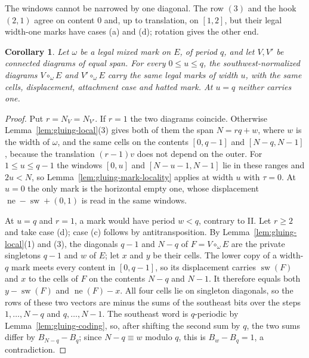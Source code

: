 \documentclass[11pt,a4paper]{amsart}
\numberwithin{equation}{section}
\theoremstyle{plain}
\newtheorem{corollary}[theorem]{Corollary}
\theoremstyle{definition}
\begin{document}
The windows cannot be narrowed by one diagonal.  The row \((3)\) and the hook \((2,1)\) agree on content \(0\) and, up to translation, on \([1,2]\), but their legal width-one marks have cases (a) and (d); rotation gives the other end.

\begin{corollary}\label{cor:gluing-mark-transfer}
Let \(\omega\) be a legal mixed mark on \(E\), of period \(q\), and let \(V,V'\) be connected diagrams of equal span.  For every \(0\le u\le q\), the southwest-normalized diagrams \(V\circ_\omega E\) and \(V'\circ_\omega E\) carry the same legal marks of width \(u\), with the same cells, displacement, attachment case and hatted mark.  At \(u=q\) neither carries one.
\end{corollary}
\begin{proof}
Put \(r=N_V=N_{V'}\).  If \(r=1\) the two diagrams coincide.  Otherwise Lemma~\ref{lem:gluing-local}(3) gives both of them the span \(N=rq+w\), where \(w\) is the width of \(\omega\), and the same cells on the contents \([0,q-1]\) and \([N-q,N-1]\), because the translation \((r-1)v\) does not depend on the outer.  For \(1\le u\le q-1\) the windows \([0,u]\) and \([N-u-1,N-1]\) lie in these ranges and \(2u<N\), so Lemma~\ref{lem:gluing-mark-locality} applies at width \(u\) with \(\tau=0\).  At \(u=0\) the only mark is the horizontal empty one, whose displacement \(\operatorname{ne}-\operatorname{sw}+(0,1)\) is read in the same windows.

At \(u=q\) and \(r=1\), a mark would have period \(w<q\), contrary to II.  Let \(r\ge2\) and take case (d); case (c) follows by antitransposition.  By Lemma~\ref{lem:gluing-local}(1) and (3), the diagonals \(q-1\) and \(N-q\) of \(F=V\circ_\omega E\) are the private singletons \(q-1\) and \(w\) of \(E\); let \(x\) and \(y\) be their cells.  The lower copy of a width-\(q\) mark meets every content in \([0,q-1]\), so its displacement carries \(\operatorname{sw}(F)\) and \(x\) to the cells of \(F\) on the contents \(N-q\) and \(N-1\).  It therefore equals both \(y-\operatorname{sw}(F)\) and \(\operatorname{ne}(F)-x\).  All four cells lie on singleton diagonals, so the rows of these two vectors are minus the sums of the southeast bits over the steps \(1,\ldots,N-q\) and \(q,\ldots,N-1\).  The southeast word is \(q\)-periodic by Lemma~\ref{lem:gluing-coding}, so, after shifting the second sum by \(q\), the two sums differ by \(B_{N-q}-B_q\); since \(N-q\equiv w\) modulo \(q\), this is \(B_w-B_q=1\), a contradiction.
\end{proof}
\end{document}
